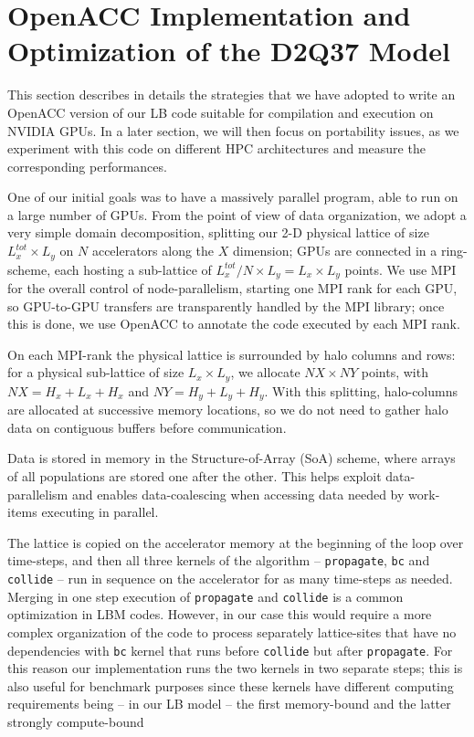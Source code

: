 \documentclass[times]{cpeauth}
\begin{document}

\section{OpenACC Implementation and Optimization of the D2Q37 Model}\label{sec:implementation}

This section describes in details the strategies that we have adopted 
to write an OpenACC version of our LB code suitable for compilation 
and execution on NVIDIA GPUs. In a later section, we will then focus 
on portability issues, as we experiment with this code on different HPC 
architectures and measure the corresponding performances.

One of our initial goals was to have a massively parallel program, 
able to run on a large number of GPUs.
%
From the point of view of data organization, we adopt a very simple domain 
decomposition, splitting our 2-D physical lattice of size $L^{tot}_x \times L_y$ 
on $N$ accelerators along the $X$ dimension; GPUs are connected in a ring-scheme,
each hosting a sub-lattice of $L^{tot}_x/N \times L_y = L_x \times L_y$ points. 
%
We use MPI for the overall control of node-parallelism, starting one MPI rank
for each GPU, so  GPU-to-GPU transfers are transparently handled by the MPI
library; once this is done, we use OpenACC to annotate the code executed by each
MPI rank. 

On each MPI-rank the physical lattice is surrounded by halo columns and rows: 
for a physical sub-lattice of size $L_x \times L_y$, we allocate $NX \times NY$ 
points, with $NX=H_x+L_x+H_x$ and $NY=H_y+L_y+H_y$.
%
With this splitting, halo-columns are allocated at successive 
memory locations, so we do not need to gather halo data on 
contiguous buffers before communication. 

Data is stored in memory in the Structure-of-Array (SoA) scheme,
where arrays of all populations are stored one after the other. This helps
exploit data-parallelism and enables data-coalescing when accessing data
needed by work-items executing in parallel.

The lattice is copied on the accelerator memory at the beginning of the 
loop over time-steps, and then all three kernels of the algorithm 
-- {\tt propagate}, {\tt bc} and {\tt collide} -- run in sequence 
on the accelerator for as many time-steps as needed.
%
Merging in one step execution of {\tt propagate} and 
{\tt collide} is a common optimization in LBM codes. 
However, in our case this would require a more complex organization 
of the code to process separately lattice-sites that have no dependencies with 
{\tt bc} kernel that runs before {\tt collide} but after {\tt propagate}. 
%
For this reason our implementation runs the two kernels in two separate steps; 
this is also useful for benchmark purposes since these kernels have different 
computing  requirements being -- in our LB model -- the first memory-bound 
and the latter strongly compute-bound    
\end{document}

